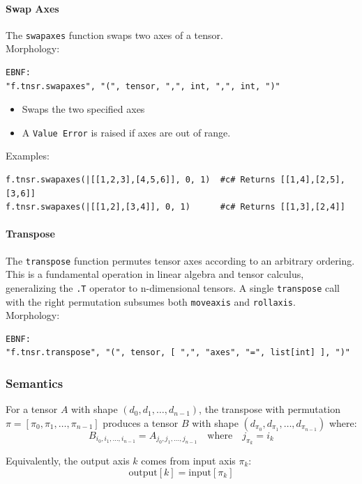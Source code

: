 \paragraph{Swap Axes}
The \texttt{swapaxes} function swaps two axes of a tensor.\\
Morphology:
\begin{verbatim}
EBNF:
"f.tnsr.swapaxes", "(", tensor, ",", int, ",", int, ")"
\end{verbatim}
\begin{itemize}
\item Swaps the two specified axes
\item A \texttt{Value Error} is raised if axes are out of range.
\end{itemize}
Examples:
\begin{verbatim}
f.tnsr.swapaxes(|[[1,2,3],[4,5,6]], 0, 1)  #c# Returns [[1,4],[2,5],[3,6]]
f.tnsr.swapaxes(|[[1,2],[3,4]], 0, 1)      #c# Returns [[1,3],[2,4]]
\end{verbatim}

\paragraph{Transpose}
\label{sec:transpose}
The \texttt{transpose} function permutes tensor axes according to an arbitrary ordering. This is a fundamental operation in linear algebra and tensor calculus, generalizing the \texttt{.T} operator to n-dimensional tensors. A single \texttt{transpose} call with the right permutation subsumes both \texttt{moveaxis} and \texttt{rollaxis}.\\
Morphology:
\begin{verbatim}
EBNF:
"f.tnsr.transpose", "(", tensor, [ ",", "axes", "=", list[int] ], ")"
\end{verbatim}

\subsubsection{Semantics}
For a tensor $A$ with shape $(d_0, d_1, \ldots, d_{n-1})$, the transpose with permutation $\pi = [\pi_0, \pi_1, \ldots, \pi_{n-1}]$ produces a tensor $B$ with shape $(d_{\pi_0}, d_{\pi_1}, \ldots, d_{\pi_{n-1}})$ where:
\begin{equation}
B_{i_0, i_1, \ldots, i_{n-1}} = A_{j_0, j_1, \ldots, j_{n-1}}
\quad \text{where} \quad j_{\pi_k} = i_k
\label{eq:transpose}
\end{equation}

Equivalently, the output axis $k$ comes from input axis $\pi_k$:
\begin{equation}
\text{output}[k] = \text{input}[\pi_k]
\label{eq:transpose-axis}
\end{equation}


